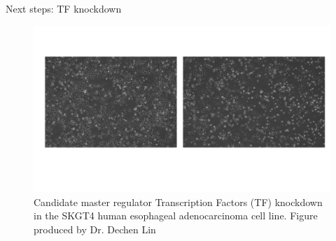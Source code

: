 \documentclass[slidestop,compress,11pt,xcolor=dvipsnames]{beamer}
\begin{document}
\begin{frame}{Next steps: TF knockdown}
\vspace{-0.5cm}
 \begin{figure}[ht!]
  \centering
  \includegraphics[width=1.0\textwidth]{glioma/knockdown_TF_ESCA.pdf}
  \caption{Candidate master regulator Transcription Factors (TF) knockdown in the SKGT4 human esophageal adenocarcinoma cell line. Figure produced by Dr. Dechen Lin}
 \end{figure}
\end{frame}
\end{document}
